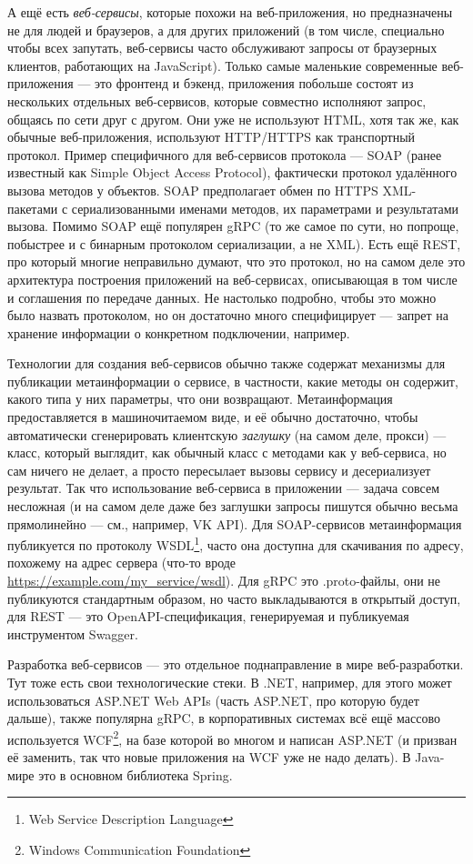 \documentclass{../../text-style}
\begin{document}
А ещё есть \emph{веб-сервисы}, которые похожи на веб-приложения, но предназначены не для людей и браузеров, а для других приложений (в том числе, специально чтобы всех запутать, веб-сервисы часто обслуживают запросы от браузерных клиентов, работающих на JavaScript). Только самые маленькие современные веб-приложения --- это фронтенд и бэкенд, приложения побольше состоят из нескольких отдельных веб-сервисов, которые совместно исполняют запрос, общаясь по сети друг с другом. Они уже не используют HTML, хотя так же, как обычные веб-приложения, используют HTTP/HTTPS как транспортный протокол. Пример специфичного для веб-сервисов протокола --- SOAP (ранее известный как Simple Object Access Protocol), фактически протокол удалённого вызова методов у объектов. SOAP предполагает обмен по HTTPS XML-пакетами с сериализованными именами методов, их параметрами и результатами вызова. Помимо SOAP ещё популярен gRPC (то же самое по сути, но попроще, побыстрее и с бинарным протоколом сериализации, а не XML). Есть ещё REST, про который многие неправильно думают, что это протокол, но на самом деле это архитектура построения приложений на веб-сервисах, описывающая в том числе и соглашения по передаче данных. Не настолько подробно, чтобы это можно было назвать протоколом, но он достаточно много специфицирует --- запрет на хранение информации о конкретном подключении, например.

Технологии для создания веб-сервисов обычно также содержат механизмы для публикации метаинформации о сервисе, в частности, какие методы он содержит, какого типа у них параметры, что они возвращают. Метаинформация предоставляется в машиночитаемом виде, и её обычно достаточно, чтобы автоматически сгенерировать клиентскую \emph{заглушку} (на самом деле, прокси) --- класс, который выглядит, как обычный класс с методами как у веб-сервиса, но сам ничего не делает, а просто пересылает вызовы сервису и десериализует результат. Так что использование веб-сервиса в приложении --- задача совсем несложная (и на самом деле даже без заглушки запросы пишутся обычно весьма прямолинейно --- см., например, VK API). Для SOAP-сервисов метаинформация публикуется по протоколу WSDL\footnote{Web Service Description Language}, часто она доступна для скачивания по адресу, похожему на адрес сервера (что-то вроде \url{https://example.com/my_service/wsdl}). Для gRPC это .proto-файлы, они не публикуются стандартным образом, но часто выкладываются в открытый доступ, для REST --- это OpenAPI-спецификация, генерируемая и публикуемая инструментом Swagger.

Разработка веб-сервисов --- это отдельное поднаправление в мире веб-разработки. Тут тоже есть свои технологические стеки. В .NET, например, для этого может использоваться ASP.NET Web APIs (часть ASP.NET, про которую будет дальше), также популярна gRPC, в корпоративных системах всё ещё массово используется WCF\footnote{Windows Communication Foundation}, на базе которой во многом и написан ASP.NET (и призван её заменить, так что новые приложения на WCF уже не надо делать). В Java-мире это в основном библиотека Spring.
\end{document}
